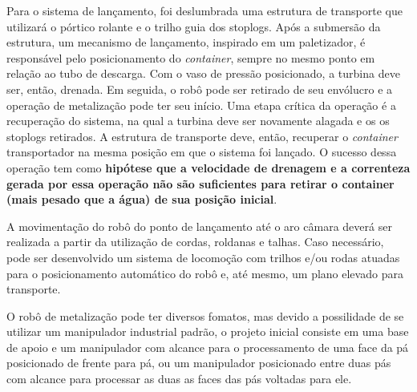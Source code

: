 Para o sistema de lançamento, foi deslumbrada uma estrutura de transporte que
utilizará o pórtico rolante e o trilho guia dos stoplogs. Após a submersão da
estrutura, um mecanismo de lançamento, inspirado em um paletizador, é
responsável pelo posicionamento do \textit{container}, sempre no mesmo ponto em
relação ao tubo de descarga. Com o vaso de pressão posicionado, a turbina deve
ser, então, drenada. Em seguida, o robô pode ser retirado de seu
envólucro e a operação de metalização pode ter seu início. Uma etapa crítica da
operação é a recuperação do sistema, na qual a turbina deve ser novamente
alagada e os os stoplogs retirados. A estrutura de transporte deve, então,
recuperar o \textit{container} transportador na mesma posição em que o sistema
foi lançado. O sucesso dessa operação tem como \textbf{hipótese que a velocidade
de drenagem e a correnteza gerada por essa operação não são suficientes para
retirar o container (mais pesado que a água) de sua posição inicial}. 

A movimentação do robô do ponto de lançamento até o aro câmara deverá ser
realizada a partir da utilização de cordas, roldanas e talhas. Caso necessário,
pode ser desenvolvido um sistema de locomoção com trilhos e/ou rodas atuadas
para o posicionamento automático do robô e, até mesmo, um plano elevado para
transporte.

O robô de metalização pode ter diversos fomatos, mas devido a possilidade de se
utilizar um manipulador industrial padrão, o projeto inicial consiste em uma
base de apoio e um manipulador com alcance para o processamento de uma face da
pá posicionado de frente para pá, ou um manipulador posicionado entre duas pás com
alcance para processar as duas as faces das pás voltadas para ele.












